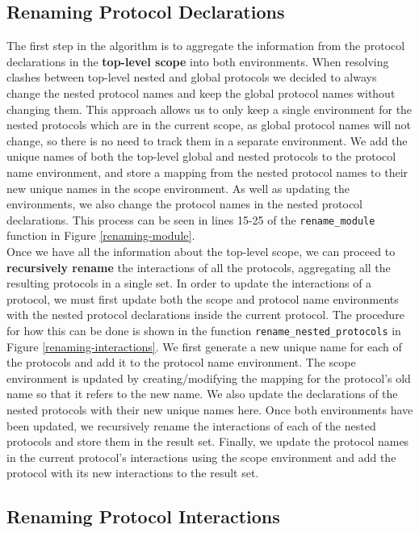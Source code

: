 \documentclass[12pt,twoside]{report}
\begin{document}
\subsection{Renaming Protocol Declarations}

The first step in the algorithm is to aggregate the information from the protocol declarations in the \textbf{top-level scope} into both environments. When resolving clashes between top-level nested and global protocols we decided to always change the nested protocol names and keep the global protocol names without changing them. This approach allows us to only keep a single environment for the nested protocols which are in the current scope, as global protocol names will not change, so there is no need to track them in a separate environment. We add the unique names of both the top-level global and nested protocols to the protocol name environment, and store a mapping from the nested protocol names to their new unique names in the scope environment. As well as updating the environments, we also change the protocol names in the nested protocol declarations. This process can be seen in lines 15-25 of the \texttt{rename\_module} function in Figure \ref{renaming-module}.\\

Once we have all the information about the top-level scope, we can proceed to \textbf{recursively rename} the interactions of all the protocols, aggregating all the resulting protocols in a single set. In order to update the interactions of a protocol, we must first update both the scope and protocol name environments with the nested protocol declarations inside the current protocol. The procedure for how this can be done is shown in the function \texttt{rename\_nested\_protocols} in Figure \ref{renaming-interactions}. We first generate a new unique name for each of the protocols and add it to the protocol name environment. The scope environment is updated by creating/modifying the mapping for the protocol's old name so that it refers to the new name. We also update the declarations of the nested protocols with their new unique names here. Once both environments have been updated, we recursively rename the interactions of each of the nested protocols and store them in the result set. Finally, we update the protocol names in the current protocol's interactions using the scope environment and add the protocol with its new interactions to the result set.
 
\subsection{Renaming Protocol Interactions}
\end{document}
